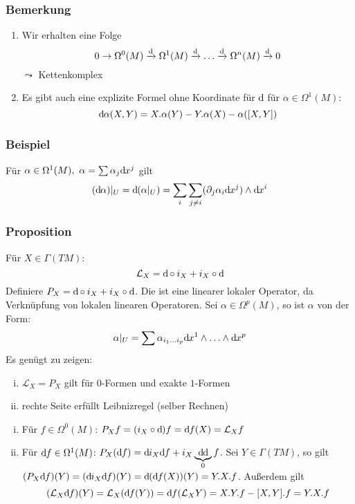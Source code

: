 \subsubsection{Bemerkung}
\label{ssub:193}
\begin{enumerate}
\item Wir erhalten eine Folge
\[
0 \to \Omega^0 (M) \xrightarrow{\mathrm{d}\mkern-1.0mu} \Omega^1 (M) \xrightarrow{\mathrm{d}\mkern-1.0mu} \ldots \xrightarrow{\mathrm{d}\mkern-1.0mu} \Omega^n (M) \xrightarrow{\mathrm{d}\mkern-1.0mu} 0
\]
$\leadsto$ Kettenkomplex
\item Es gibt auch eine explizite Formel ohne Koordinate für $\mathrm{d}\mkern-1.0mu$ für $\alpha \in \Omega^1 (M):$
\[
\mathrm{d}\mkern-1.0mu \alpha(X,Y) = X.\alpha(Y) - Y.\alpha(X) - \alpha([X,Y])
\]
\end{enumerate}

\subsubsection{Beispiel}
\label{ssub:194}
Für $\alpha \in \Omega^1 (M),\ \alpha = \sum \alpha_j \mathrm{d}\mkern-1.0mu x^j$ gilt
\[
(\mathrm{d}\mkern-1.0mu \alpha)\vert_U = \mathrm{d}\mkern-1.0mu(\alpha\vert_U) = \sum_i \sum_{j\neq i} (\partial_j \alpha_i \mathrm{d}\mkern-1.0mu x^j) \wedge \mathrm{d}\mkern-1.0mu x^i
\]

\subsubsection[Proposition: Cartansche Formel]{Proposition}
\label{ssub:195}
Für $X\in \Gamma(TM)$:
\[
\mathcal{L}_X = \mathrm{d}\mkern-1.0mu \circ i_X + i_X \circ \mathrm{d}\mkern-1.0mu
\]
Definiere $P_X = \mathrm{d}\mkern-1.0mu \circ i_X + i_X \circ \mathrm{d}\mkern-1.0mu$. Die ist eine linearer lokaler Operator, da Verknüpfung von lokalen linearen Operatoren. Sei $\alpha \in \Omega^p (M)$, so ist $\alpha$ von der Form:
\[
\alpha\vert_U = \sum \alpha_{i_1 \ldots i_p} \mathrm{d}\mkern-1.0mu x^1 \wedge \ldots \wedge \mathrm{d}\mkern-1.0mu x^p
\]
Es genügt zu zeigen:
\begin{enumerate}[(i)]
\item $\mathcal{L}_X = P_X$ gilt für $0$-Formen und exakte $1$-Formen 
\item rechte Seite erfüllt Leibnizregel (selber Rechnen)
\end{enumerate}
\begin{enumerate}[(i)]
\item Für $f\in \Omega^0 (M)$: $P_X f = (i_X \circ \mathrm{d}\mkern-1.0mu)f = \mathrm{d}\mkern-1.0mu f (X) = \mathcal{L}_X f$
\item Für $\mathrm{d}\mkern-1.0mu f \in \Omega^1 (M)$: $P_X(\mathrm{d}\mkern-1.0mu f) = \mathrm{d}\mkern-1.0mu i_X \mathrm{d}\mkern-1.0mu f + i_X \underbrace{\mathrm{d}\mkern-1.0mu \mathrm{d}\mkern-1.0mu}_{0} f$.
Sei $Y\in \Gamma(TM)$, so gilt $(P_X \mathd f)(Y) = (\mathd i_X \mathd f)(Y) = \mathd \enbrace*{\mathd f(X)}(Y) = Y.X.f$. Außerdem gilt
\[
\enbrace*{\mathcal{L}_X \mathd f}(Y) = \mathcal{L}_X \enbrace*{\mathd f (Y)} = \mathd f \enbrace*{\mathcal{L}_X Y} = X.Y.f - \benbrace{X,Y}.f = Y.X.f
\]
\end{enumerate}

